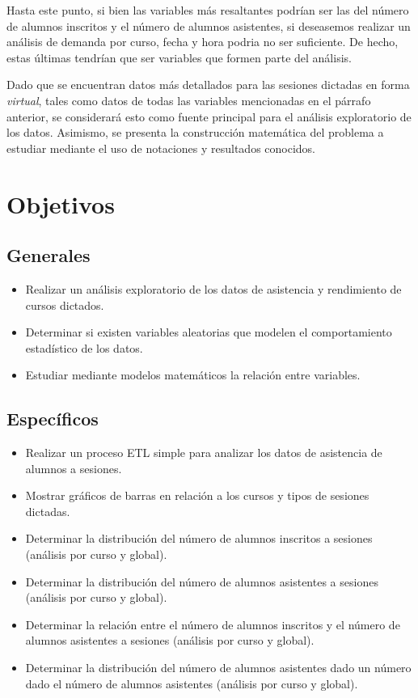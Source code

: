 \documentclass[11pt,a4paper]{book}
\theoremstyle{definition}%
\begin{document}
        Hasta este punto, si bien las variables más resaltantes podrían ser las del número de alumnos inscritos y el número de alumnos asistentes, si deseasemos realizar un análisis de demanda por curso, fecha y hora podria no ser suficiente. De hecho, estas últimas tendrían que ser variables que formen parte del análisis.

        Dado que se encuentran datos más detallados para las sesiones dictadas en forma \textit{virtual}, tales como datos de todas las variables mencionadas en el párrafo anterior, se considerará esto como fuente principal para el análisis exploratorio de los datos. Asimismo, se presenta la construcción matemática del problema a estudiar mediante el uso de notaciones y resultados conocidos.          
            
        \chapter{Objetivos}
            \section{Generales}
                \begin{itemize}
                    \item Realizar un análisis exploratorio de los datos de asistencia y rendimiento de cursos dictados.
                    \item Determinar si existen variables aleatorias que modelen el comportamiento estadístico de los datos.
                    \item Estudiar mediante modelos matemáticos la relación entre variables.
                \end{itemize}
            \section{Específicos}
                \begin{itemize}
                    \item Realizar un proceso ETL simple para analizar los datos de asistencia de alumnos a sesiones.
                    \item Mostrar gráficos de barras en relación a los cursos y tipos de sesiones dictadas.
                    \item Determinar la distribución del número de alumnos inscritos a sesiones (análisis por curso y global).
                    \item Determinar la distribución del número de alumnos asistentes a sesiones (análisis por curso y global).
                    \item Determinar la relación entre el número de alumnos inscritos y el número de alumnos asistentes a sesiones (análisis por curso y global).
                    \item Determinar la distribución del número de alumnos asistentes dado un número dado el número de alumnos asistentes (análisis por curso y global).
                \end{itemize}
\end{document}
